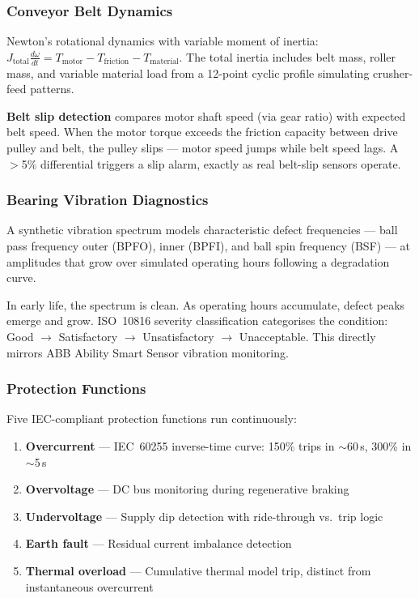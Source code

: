 \documentclass[9pt,a4paper,twocolumn,twoside]{tau-class/tau}
\begin{document}
\subsubsection{Conveyor Belt Dynamics}

Newton's rotational dynamics with variable moment of inertia: $J_{\text{total}}\frac{d\omega}{dt} = T_{\text{motor}} - T_{\text{friction}} - T_{\text{material}}$. The total inertia includes belt mass, roller mass, and variable material load from a 12-point cyclic profile simulating crusher-feed patterns.

\textbf{Belt slip detection} compares motor shaft speed (via gear ratio) with expected belt speed. When the motor torque exceeds the friction capacity between drive pulley and belt, the pulley slips — motor speed jumps while belt speed lags. A $>$5\% differential triggers a slip alarm, exactly as real belt-slip sensors operate.

\subsubsection{Bearing Vibration Diagnostics}

A synthetic vibration spectrum models characteristic defect frequencies — ball pass frequency outer (BPFO), inner (BPFI), and ball spin frequency (BSF) — at amplitudes that grow over simulated operating hours following a degradation curve.

In early life, the spectrum is clean. As operating hours accumulate, defect peaks emerge and grow. ISO~10816 severity classification categorises the condition: Good $\rightarrow$ Satisfactory $\rightarrow$ Unsatisfactory $\rightarrow$ Unacceptable. This directly mirrors ABB Ability Smart Sensor vibration monitoring.

\subsubsection{Protection Functions}

Five IEC-compliant protection functions run continuously:

\begin{enumerate}
    \item \textbf{Overcurrent} — IEC~60255 inverse-time curve: 150\% trips in $\sim$60\,s, 300\% in $\sim$5\,s
    \item \textbf{Overvoltage} — DC bus monitoring during regenerative braking
    \item \textbf{Undervoltage} — Supply dip detection with ride-through vs.\ trip logic
    \item \textbf{Earth fault} — Residual current imbalance detection
    \item \textbf{Thermal overload} — Cumulative thermal model trip, distinct from instantaneous overcurrent
\end{enumerate}
\end{document}
